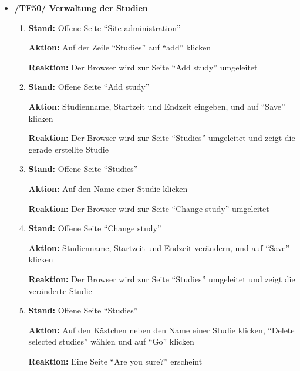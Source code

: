 \documentclass[a4paper]{scrreprt}
\begin{document}
\begin{itemize}
		                      \item \textbf{/TF50/ Verwaltung der Studien}
		                          \begin{enumerate}
		                              \item \par \textbf{Stand: }Offene Seite ``Site administration''
		                                    \par \textbf{Aktion: }Auf der Zeile ``Studies'' auf ``add'' klicken
		                                    \par \textbf{Reaktion: }Der Browser wird zur Seite ``Add study'' umgeleitet
		                              \item \par \textbf{Stand: }Offene Seite ``Add study''
		                                    \par \textbf{Aktion: }Studienname, Startzeit und Endzeit eingeben, und auf ``Save'' klicken
		                                    \par \textbf{Reaktion: }Der Browser wird zur Seite ``Studies'' umgeleitet und zeigt die gerade erstellte Studie
		                              \item \par \textbf{Stand: }Offene Seite ``Studies''
		                                    \par \textbf{Aktion: }Auf den Name einer Studie klicken
		                                    \par \textbf{Reaktion: }Der Browser wird zur Seite ``Change study'' umgeleitet
		                              \item \par \textbf{Stand: }Offene Seite ``Change study''
		                                    \par \textbf{Aktion: }Studienname, Startzeit und Endzeit ver\"andern, und auf ``Save'' klicken
		                                    \par \textbf{Reaktion: }Der Browser wird zur Seite ``Studies'' umgeleitet und zeigt die ver\"anderte Studie
		                              \item \par \textbf{Stand: }Offene Seite ``Studies''
		                                    \par \textbf{Aktion: }Auf den K\"astchen neben den Name einer Studie klicken, ``Delete selected studies'' w\"ahlen und auf ``Go'' klicken
		                                    \par \textbf{Reaktion: }Eine Seite ``Are you sure?'' erscheint

\end{enumerate}
\end{itemize}
\end{document}
